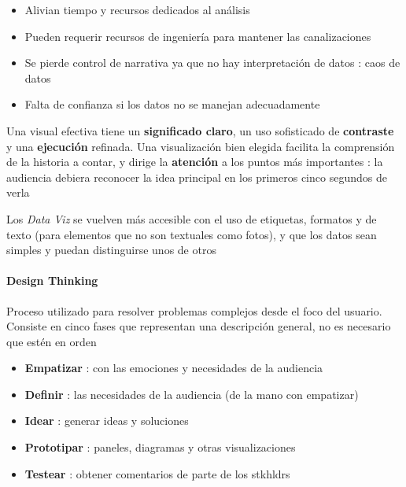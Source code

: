 \begin{itemize}
{\begin{description}
{\begin{itemize}
            \item {Alivian tiempo y recursos dedicados al análisis}
        \end{itemize}}
        \item[Contras]{
        \begin{itemize}
            \item {Pueden requerir recursos de ingeniería para mantener las canalizaciones}
            \item {Se pierde control de narrativa ya que no hay interpretación de datos : caos de datos}
            \item {Falta de confianza si los datos no se manejan adecuadamente}
        \end{itemize}
        }
    \end{description}}
\end{itemize}
Una visual efectiva tiene un \textbf{significado claro}, un uso sofisticado de \textbf{contraste} y una \textbf{ejecución} refinada. Una visualización bien elegida facilita la comprensión de la historia a contar, y dirige la \textbf{atención} a los puntos más importantes : la audiencia debiera reconocer la idea principal en los primeros cinco segundos de verla

Los \textit{Data Viz} se vuelven más accesible con el uso de etiquetas, formatos y de texto (para elementos que no son textuales como fotos), y que los datos sean simples y puedan distinguirse unos de otros

\paragraph{Design Thinking}
Proceso utilizado para resolver problemas complejos desde el foco del usuario. Consiste en cinco fases que representan una descripción general, no es necesario que estén en orden
\begin{itemize}
    \item {\textbf{Empatizar} : con las emociones y necesidades de la audiencia}
    \item {\textbf{Definir} : las necesidades de la audiencia (de la mano con empatizar)}
    \item {\textbf{Idear} : generar ideas y soluciones} 
    \item {\textbf{Prototipar} : paneles, diagramas y otras visualizaciones}
    \item {\textbf{Testear} : obtener comentarios de parte de los \gls{stkhldrs}}
\end{itemize}


